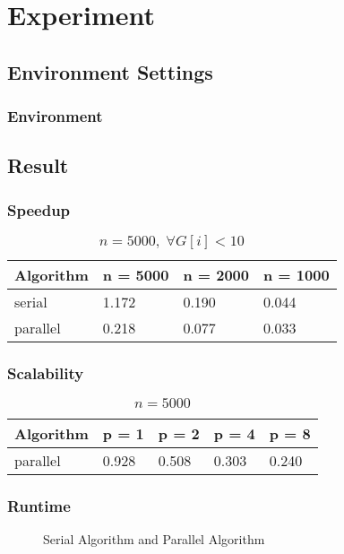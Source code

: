 \section{Experiment}

\subsection{Environment Settings}
\begin{frame}
    \frametitle{Environment}
\end{frame}

\subsection{Result}
\begin{frame}
    \frametitle{Speedup}
    \begin{table}
    	\caption{$n = 5000, \; \forall G[i] < 10$}
		\begin{tabular}{| l | l | l | l |}
			\hline
			Algorithm 		& n = 5000 & n = 2000 & n = 1000\\ \hline
			serial 			& 1.172 & 0.190 & 0.044\\ \hline
			parallel 	& 0.218 & 0.077 & 0.033\\ \hline
		\end{tabular}
	\end{table}
\end{frame}

\begin{frame}
    \frametitle{Scalability}
    \begin{table}
    	\caption{$n = 5000$}
		\begin{tabular}{| l | l | l | l | l |}
			\hline
			Algorithm 	& p = 1 & p = 2 & p = 4 & p = 8\\ \hline
			parallel 	& 0.928  & 0.508 & 0.303 & 0.240 \\ \hline
		\end{tabular}
	\end{table}
\end{frame}

\begin{frame}
	\frametitle{Runtime}
	\begin{figure}[!ht]
		\centering
		\subfigure[Runtime]{
			
			\label{fig:fig-parallel}
		}
		\caption{Serial Algorithm and Parallel Algorithm}
		\label{fig:light_weight}
	\end{figure}
\end{frame}